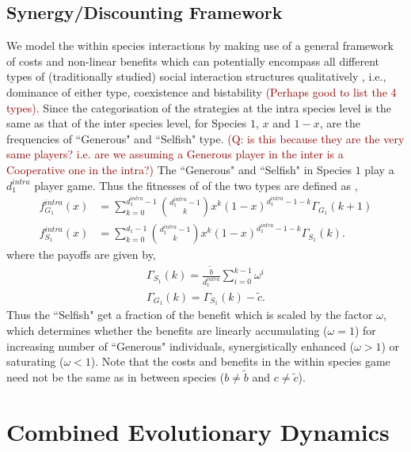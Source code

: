 \documentclass[12pt]{article}
\newcommand{\marcus}[1]{\textcolor{darkred}{(#1)}}
\begin{document}
\begin{appendices}
\subsection*{Synergy/Discounting Framework}
We model the within species interactions by making use of a general framework of costs and non-linear benefits \citep{eshel:AmNat:1988,hauert:JTB:2006a} which can potentially encompass all different types of (traditionally studied) social interaction structures qualitatively \citep{nowak:book:2006}, i.e., dominance of either type, coexistence and bistability \marcus{Perhaps good to list the 4 types}.
Since the categorisation of the strategies at the intra species level is the same as that of the inter species level, for Species $1$, $x$ and $1-x$, are the frequencies of ``Generous" and ``Selfish" type. \marcus{Q: is this because they are the very same players? i.e. are we assuming a Generous player in the inter is a Cooperative one in the intra?}
The ``Generous" and ``Selfish" in Species $1$ play a $d_1^{intra}$ player game.
Thus the fitnesses of of the two types are defined as \citep{hauert:JTB:2006a},
%
\begin{align}
	f^{intra}_{G_1} (x) &= \sum_{k=0}^{d_1^{intra} -1} \binom{d_1^{intra} -1}{k}x^k (1-x)^{d_1^{intra} -1-k} \Gamma_{G_1}(k+1) \nonumber \\
	f^{intra}_{S_1} (x) &= \sum_{k=0}^{d_1 -1} \binom{d_1^{intra} -1}{k}x^k (1-x)^{d_1^{intra} -1-k} \Gamma_{S_1}(k).
\label{intrafiteqs}
\end{align}
%
where the payoffs are given by,
\begin{align}
	\Gamma_{S_1} (k) = \frac{\tilde{b}}{d_1^{intra}} \sum_{i=0}^{k-1} \omega^i \nonumber \\
	\Gamma_{G_1} (k) = \Gamma_{S_1} (k) - \tilde{c}.
\label{eqintragamepayoffs}
\end{align}
%
Thus the ``Selfish" get a fraction of the benefit which is scaled by the factor $\omega$, which determines whether the benefits are linearly accumulating ($\omega=1$) for increasing number of ``Generous" individuals, synergistically enhanced ($\omega>1$) or saturating ($\omega<1$).
Note that the costs and benefits in the within species game need not be the same as in between species ($b\neq \tilde{b}$ and $c \neq \tilde{c}$).


\section{Combined Evolutionary Dynamics}
\label{app:combineddyn}


\end{appendices}
\end{document}
